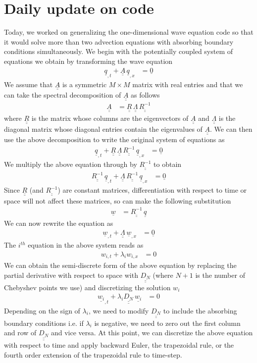 \documentclass[12pt]{article}
\newcommand{\bunderline}[1]{\underline{#1}}
\renewcommand{\vec}[1]{{\bunderline{#1}}}
\newcommand{\mat}[1]{{\bunderline{\bunderline{#1}}}}
\begin{document}
\section*{Daily update on code}
Today, we worked on generalizing the one-dimensional wave equation code so that it would solve more than two advection equations with absorbing boundary conditions simultaneously.
We begin with the potentially coupled system of equations we obtain by transforming the wave equation
\begin{align}
	\vec{q}_{, t} + \mat{A} \, \vec{q}_{, x} & = \vec{0}
\end{align}
We assume that $\mat{A}$ is a symmetric $M \times M$ matrix with real entries and that we can take the spectral decomposition of $\mat{A}$ as follows
\begin{align}
	\mat{A} & = \mat{R} \, \mat{\Lambda} \, \mat{R^{-1}}
\end{align}
where $\mat{R}$ is the matrix whose columns are the eigenvectors of $\mat{A}$ and $\mat{\Lambda}$ is the diagonal matrix whose diagonal entries contain the eigenvalues of $\mat{A}$.
We can then use the above decomposition to write the original system of equations as
\begin{align}
	\vec{q}_{, t} + \mat{R} \, \mat{\Lambda} \, \mat{R^{-1}} \, \vec{q}_{, x} & = \vec{0}
\end{align}
We multiply the above equation through by $\mat{R^{-1}}$ to obtain
\begin{align}
	\mat{R^{-1}} \, \vec{q}_{, t} + \mat{\Lambda} \, \mat{R^{-1}} \, \vec{q}_{, x} & = \vec{0}
\end{align}
Since $\mat{R}$ (and $\mat{R^{-1}}$) are constant matrices, differentiation with respect to time or space will not affect these matrices, so can make the following substitution
\begin{align}
	\vec{w} & = \mat{R^{-1}} \, \vec{q}
\end{align}
We can now rewrite the equation as
\begin{align} 
	\vec{w}_{, t} + \mat{\Lambda} \, \vec{w}_{, x} & = \vec{0}
\end{align}
The $i^{th}$ equation in the above system reads as 
\begin{align}
	w_{i, t} + \lambda_{i} w_{i, x} & = 0
\end{align}
We can obtain the semi-discrete form of the above equation by replacing the partial derivative with respect to space with $\mat{D_{N}}$ (where $N + 1$ is the number of Chebyshev points we use) and discretizing the solution $w_{i}$
\begin{align}
	\vec{w_{i}}_{, t} + \lambda_{i} \mat{D_{N}} \, \vec{w_{i}} & = 0
\end{align}
Depending on the sign of $\lambda_{i}$, we need to modify $\mat{D_{N}}$ to include the absorbing boundary conditions i.e. if $\lambda_{i}$ is negative, we need to zero out the first column and row of $\mat{D_{N}}$ and vice versa. 
At this point, we can discretize the above equation with respect to time and apply backward Euler, the trapezoidal rule, or the fourth order extension of the trapezoidal rule to time-step.
\end{document}
